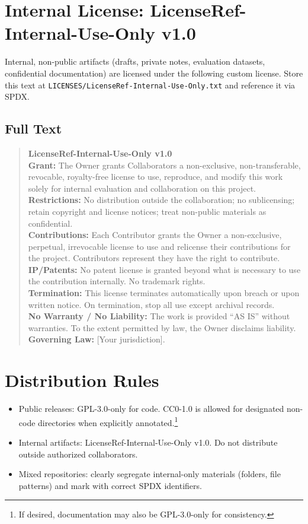 \documentclass[11pt]{article}
\begin{document}
\section*{Internal License: LicenseRef-Internal-Use-Only v1.0}
Internal, non-public artifacts (drafts, private notes, evaluation datasets, confidential documentation) are licensed under the following custom license. Store this text at \texttt{LICENSES/LicenseRef-Internal-Use-Only.txt} and reference it via SPDX.

\subsection*{Full Text}
\begin{quote}\small
\textbf{LicenseRef-Internal-Use-Only v1.0}\\[0.3em]
\textbf{Grant:} The Owner grants Collaborators a non-exclusive, non-transferable, revocable, royalty-free license to use, reproduce, and modify this work solely for internal evaluation and collaboration on this project.\\
\textbf{Restrictions:} No distribution outside the collaboration; no sublicensing; retain copyright and license notices; treat non-public materials as confidential.\\
\textbf{Contributions:} Each Contributor grants the Owner a non-exclusive, perpetual, irrevocable license to use and relicense their contributions for the project. Contributors represent they have the right to contribute.\\
\textbf{IP/Patents:} No patent license is granted beyond what is necessary to use the contribution internally. No trademark rights.\\
\textbf{Termination:} This license terminates automatically upon breach or upon written notice. On termination, stop all use except archival records.\\
\textbf{No Warranty / No Liability:} The work is provided “AS IS” without warranties. To the extent permitted by law, the Owner disclaims liability.\\
\textbf{Governing Law:} [Your jurisdiction].
\end{quote}

\section*{Distribution Rules}
\begin{itemize}[leftmargin=*]
  \item Public releases: GPL-3.0-only for code. CC0-1.0 is allowed for designated non-code directories when explicitly annotated.\footnote{If desired, documentation may also be GPL-3.0-only for consistency.}
  \item Internal artifacts: LicenseRef-Internal-Use-Only v1.0. Do not distribute outside authorized collaborators.
  \item Mixed repositories: clearly segregate internal-only materials (folders, file patterns) and mark with correct SPDX identifiers.
\end{itemize}
\end{document}

